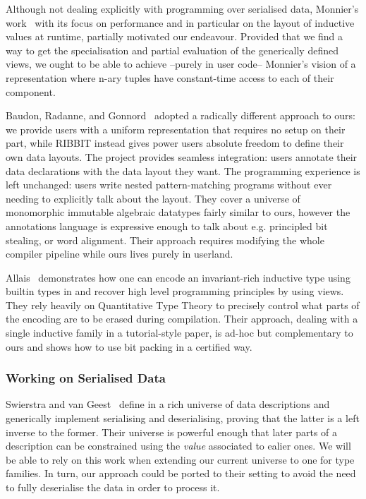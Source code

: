 Although not dealing explicitly with programming over serialised data,
Monnier's work~\citeyearpar{DBLP:conf/icfp/Monnier19} with its focus on performance and
in particular on the layout of inductive values at runtime,
partially motivated our endeavour.
%
Provided that we find a way to get the specialisation and partial evaluation
of the generically defined views, we ought to be able to achieve --purely in
user code-- Monnier's vision of a representation where n-ary tuples have
constant-time access to each of their component.

Baudon, Radanne, and Gonnord~\citeyearpar{ACM:conf/icfp/Baudon23} adopted
a radically different approach to ours: we provide users with a
uniform representation that requires no setup on their part,
while \textsc{RIBBIT} instead gives power users absolute freedom
to define their own data layouts.
%
The project provides seamless integration: users annotate their
data declarations with the data layout they want.
%
The programming experience is left unchanged: users write nested
pattern-matching programs without ever needing to explicitly talk
about the layout.
%
They cover a universe of monomorphic immutable algebraic datatypes
fairly similar to ours, however the annotations language is expressive
enough to talk about e.g. principled bit stealing, or word alignment.
%
Their approach requires modifying the whole compiler pipeline while
ours lives purely in userland.
%


Allais~\citeyearpar{DBLP:conf/esop/Allais23}
demonstrates how one can encode an
invariant-rich inductive type using builtin types
in \idris{} and recover high level programming principles
by using views.
%
They rely heavily on Quantitative Type Theory to precisely
control what parts of the encoding are to be erased during
compilation.
%
Their approach, dealing with a single inductive family in a
tutorial-style paper, is ad-hoc but complementary to ours
and shows how to use bit packing in a certified way.

\subsubsection{Working on Serialised Data}

Swierstra and van Geest~\citeyearpar{DBLP:conf/icfp/GeestS17}
define in \agda{} a rich universe of data descriptions
and generically implement serialising and deserialising,
proving that the latter is a left inverse to the former.
%
Their universe is powerful enough that later parts of a
description can be constrained using the \emph{value}
associated to ealier ones.
%
We will be able to rely on this work when extending our
current universe to one for type families.
%
In turn, our approach could be ported to their setting
to avoid the need to fully deserialise the data in order
to process it.


